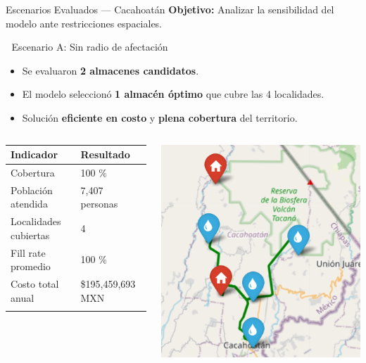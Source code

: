 \documentclass[
  ignorenonframetext,
]{beamer}
\providecommand{\tightlist}{%
  \setlength{\itemsep}{0pt}\setlength{\parskip}{0pt}}
\begin{document}
\begin{frame}{Escenarios Evaluados --- Cacahoatán}
\label{escenarios-evaluados-cacahoatuxe1n}
\textbf{Objetivo:} Analizar la sensibilidad del modelo ante
restricciones espaciales.

🔹 Escenario A: Sin radio de afectación

\begin{itemize}
\tightlist
\item
  Se evaluaron \textbf{2 almacenes candidatos}.\\
\item
  El modelo seleccionó \textbf{1 almacén óptimo} que cubre las 4
  localidades.\\
\item
  Solución \textbf{eficiente en costo} y \textbf{plena cobertura} del
  territorio.
\end{itemize}

\begin{columns}[T]
\begin{column}{0.6\linewidth}
\begin{longtable}[]{@{}ll@{}}
\toprule\noalign{}
Indicador & Resultado \\
\midrule\noalign{}
\endhead
Cobertura & 100 \% \\
Población atendida & 7,407 personas \\
Localidades cubiertas & 4 \\
Fill rate promedio & 100 \% \\
Costo total anual & \$195,459,693 MXN \\
\bottomrule\noalign{}
\end{longtable}
\end{column}

\begin{column}{0.4\linewidth}
\includegraphics[width=0.8\linewidth,height=\textheight,keepaspectratio]{almacen.png}
\end{column}
\end{columns}
\end{frame}
\end{document}
